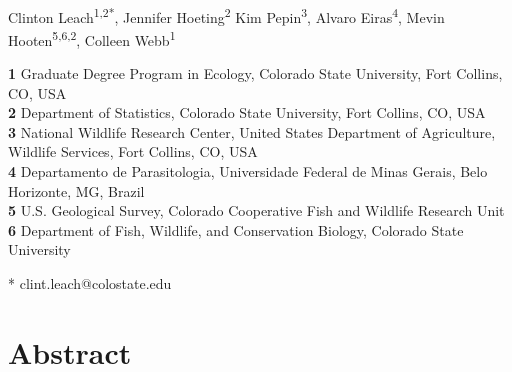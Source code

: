 \documentclass[10pt,letterpaper]{article}
\date{}
\begin{document}
\vspace*{0.2in}

\begin{flushleft}
{\Large
\textbf{}
}
\newline
\\
Clinton Leach\textsuperscript{1,2*},
Jennifer Hoeting\textsuperscript{2}
Kim Pepin\textsuperscript{3},
Alvaro Eiras\textsuperscript{4},
Mevin Hooten\textsuperscript{5,6,2},
Colleen Webb\textsuperscript{1}


\bigskip
\textbf{1} Graduate Degree Program in Ecology, Colorado State University, Fort Collins, CO, USA
\\
\textbf{2} Department of Statistics, Colorado State University, Fort Collins, CO, USA
\\
\textbf{3} National Wildlife Research Center, United States Department of Agriculture, Wildlife Services, Fort Collins, CO, USA
\\
\textbf{4} Departamento de Parasitologia, Universidade Federal de Minas Gerais, Belo Horizonte, MG, Brazil
\\
\textbf{5} U.S. Geological Survey, Colorado Cooperative Fish and Wildlife Research Unit
\\
\textbf{6} Department of Fish, Wildlife, and Conservation Biology, Colorado State University
\bigskip

% 


* clint.leach@colostate.edu

\end{flushleft}
\section*{Abstract}
\end{document}
